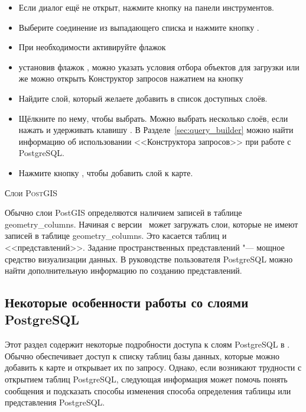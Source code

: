 \begin{itemize}[label=--]
\item Если диалог  ещё не открыт, нажмите
кнопку  на панели
инструментов.
\item Выберите соединение из выпадающего списка и нажмите кнопку
.
\item При необходимости активируйте флажок 
\item установив флажок , можно указать условия
отбора объектов для загрузки или же можно открыть Конструктор запросов
нажатием на кнопку 
\item Найдите слой, который желаете добавить в список доступных слоёв.
\item Щёлкните по нему, чтобы выбрать. Можно выбрать несколько слоёв,
если нажать и удерживать клавишу . В
Разделе~\ref{sec:query_builder} можно найти информацию об использовании
<<Конструктора запросов>> при работе с PostgreSQL.
\item Нажмите кнопку , чтобы добавить слой к карте.
\end{itemize}

\begin{Tip}\caption{\textsc{Слои PostGIS}}
Обычно слои PostGIS определяются наличием записей в таблице
geometry\_columns. Начиная с версии \OLD\, %
\qg может загружать слои, которые не имеют записей в таблице
geometry\_columns. Это касается таблиц и <<представлений>>.
Задание пространственных представлений "--- мощное средство визуализации данных.
В руководстве пользователя PostgreSQL можно найти дополнительную информацию
по созданию представлений.
\end{Tip}

\subsection{Некоторые особенности работы со слоями PostgreSQL}
\label{sec:postgis_details}

Этот раздел содержит некоторые подробности доступа к слоям PostgreSQL в \qg.
Обычно \qg обеспечивает доступ к списку таблиц базы данных, которые можно
добавить к карте и открывает их по запросу. Однако, если возникают трудности
с открытием таблиц PostgreSQL, следующая информация может помочь
понять сообщения \qg и подсказать способы изменения способа определения
таблицы или представления PostgreSQL.

